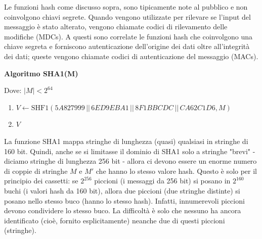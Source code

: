 \documentclass{article}
\theoremstyle{definition}
\begin{document}
    
    

Le funzioni hash come discusso sopra, sono tipicamente note al pubblico e non coinvolgono chiavi segrete. Quando vengono utilizzate per rilevare se l'input del messaggio è stato alterato, vengono chiamate codici di rilevamento delle modifiche (MDCs). A questi sono correlate le funzioni hash che coinvolgono una chiave segreta e forniscono autenticazione dell'origine dei dati oltre all'integrità dei dati; queste vengono chiamate codici di autenticazione del messaggio (MACs).

\begin{mdframed}
\begin{center}
    \vspace{10pt}
    \textbf{Algoritmo SHA1(M)}
    \vspace{10pt}
\end{center} 
Dove: $|M| < 2^{64}$
\begin{enumerate}
    \item $V \leftarrow \text{SHF1}( 5A827999 \, || \, 6ED9EBA1 \, || \, 8F1BBCDC \, || \, CA62C1D6, M )$ 
    \item {} $V$
\end{enumerate}
\end{mdframed}

La funzione SHA1 mappa stringhe di lunghezza (quasi) qualsiasi in stringhe di 160 bit. Quindi, anche se si limitasse il dominio di SHA1 solo a stringhe "brevi" - diciamo stringhe di lunghezza 256 bit - allora ci devono essere un enorme numero di coppie di stringhe \( M \) e \( M' \) che hanno lo stesso valore hash. Questo è solo per il principio dei cassetti: se \( 2^{256} \) piccioni (i messaggi da 256 bit) si posano in \( 2^{160} \) buchi (i valori hash da 160 bit), allora due piccioni (due stringhe distinte) si posano nello stesso buco (hanno lo stesso hash). Infatti, innumerevoli piccioni devono condividere lo stesso buco. La difficoltà è solo che nessuno ha ancora identificato (cioè, fornito esplicitamente) neanche due di questi piccioni (stringhe).
\end{document}
